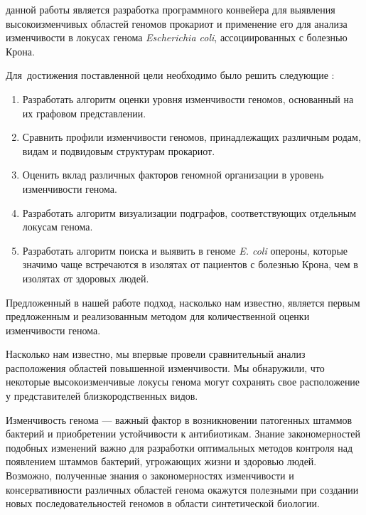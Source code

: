 {\aim} данной работы является разработка программного конвейера для выявления высокоизменчивых областей геномов прокариот и применение его для анализа изменчивости в локусах генома \textit{Escherichia coli}, ассоциированных с болезнью Крона.


Для~достижения поставленной цели необходимо было решить следующие {\tasks}:
\begin{enumerate}[beginpenalty=10000] 
  \item Разработать алгоритм оценки уровня изменчивости геномов, основанный на их графовом представлении.
  \item Сравнить профили изменчивости геномов, принадлежащих различным родам, видам и подвидовым структурам прокариот.
  \item Оценить вклад различных факторов геномной организации в уровень изменчивости генома. 
  \item Разработать алгоритм визуализации подграфов, соответствующих отдельным локусам генома.
  \item Разработать алгоритм поиска и выявить в геноме \textit{E. coli} опероны, которые значимо чаще встречаются в изолятах от пациентов с болезнью Крона, чем в изолятах от здоровых людей.  
\end{enumerate}


{\novelty}
Предложенный в нашей работе подход, насколько нам известно, является первым предложенным и реализованным методом для количественной оценки изменчивости генома. 

Насколько нам известно, мы впервые провели сравнительный анализ расположения областей повышенной изменчивости. Мы обнаружили, что некоторые высокоизменчивые локусы генома могут сохранять свое расположение у представителей близкородственных видов. 

{\influence} 

Изменчивость генома --- важный фактор в возникновении патогенных штаммов бактерий и приобретении устойчивости к антибиотикам. Знание закономерностей подобных изменений важно для разработки оптимальных методов контроля над появлением штаммов бактерий, угрожающих жизни и здоровью людей. Возможно, полученные знания о закономерностях изменчивости и консервативности различных областей генома окажутся полезными при создании новых последовательностей геномов в области синтетической биологии. 

